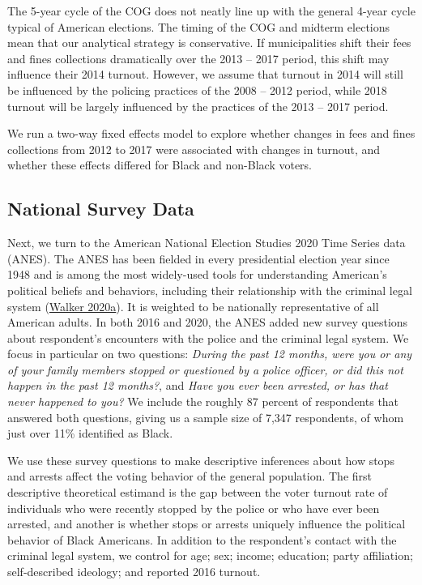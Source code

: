 \documentclass[
  12pt,
]{article}
\begin{document}
The 5-year cycle of the COG does not neatly line up with the general 4-year cycle typical of American elections. The timing of the COG and midterm elections mean that our analytical strategy is conservative. If municipalities shift their fees and fines collections dramatically over the 2013 -- 2017 period, this shift may influence their 2014 turnout. However, we assume that turnout in 2014 will still be influenced by the policing practices of the 2008 -- 2012 period, while 2018 turnout will be largely influenced by the practices of the 2013 -- 2017 period.

We run a two-way fixed effects model to explore whether changes in fees and fines collections from 2012 to 2017 were associated with changes in turnout, and whether these effects differed for Black and non-Black voters.

\hypertarget{national-survey-data}{%
\subsection*{National Survey Data}\label{national-survey-data}}

Next, we turn to the American National Election Studies 2020 Time Series data (ANES). The ANES has been fielded in every presidential election year since 1948 and is among the most widely-used tools for understanding American's political beliefs and behaviors, including their relationship with the criminal legal system (\protect\hyperlink{ref-Walker2020}{Walker 2020a}). It is weighted to be nationally representative of all American adults. In both 2016 and 2020, the ANES added new survey questions about respondent's encounters with the police and the criminal legal system. We focus in particular on two questions: \emph{During the past 12 months, were you or any of your family members stopped or questioned by a police officer, or did this not happen in the past 12 months?}, and \emph{Have you ever been arrested, or has that never happened to you?} We include the roughly 87 percent of respondents that answered both questions, giving us a sample size of 7,347 respondents, of whom just over 11\% identified as Black.

We use these survey questions to make descriptive inferences about how stops and arrests affect the voting behavior of the general population. The first descriptive theoretical estimand is the gap between the voter turnout rate of individuals who were recently stopped by the police or who have ever been arrested, and another is whether stops or arrests uniquely influence the political behavior of Black Americans. In addition to the respondent's contact with the criminal legal system, we control for age; sex; income; education; party affiliation; self-described ideology; and reported 2016 turnout.
\end{document}
